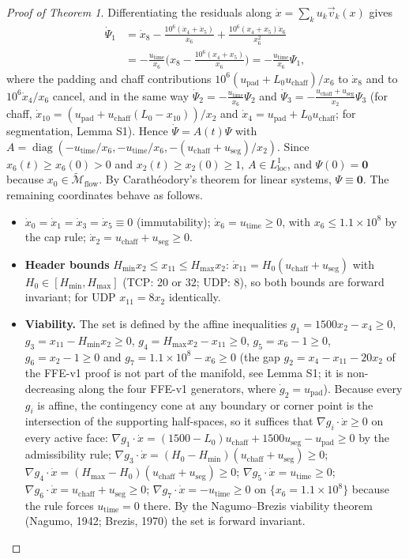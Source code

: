 \begin{proof}[Proof of Theorem 1]
Differentiating the residuals along $\dot x=\sum_ku_k\vec v_k(x)$ gives
\begin{align}
\dot\Psi_1&=\dot x_8-\tfrac{10^6(\dot x_4+\dot x_5)}{x_6}+\tfrac{10^6(x_4+x_5)\dot x_6}{x_6^2}\nonumber\\
 &=-\tfrac{u_{\text{time}}}{x_6}\Big(x_8-\tfrac{10^6(x_4+x_5)}{x_6}\Big)=-\tfrac{u_{\text{time}}}{x_6}\Psi_1,
\end{align}
where the padding and chaff contributions $10^6(u_{\text{pad}}+L_0u_{\text{chaff}})/x_6$ to $\dot x_8$ and to $10^6\dot x_4/x_6$ cancel,
and in the same way $\dot\Psi_2=-\tfrac{u_{\text{time}}}{x_6}\Psi_2$ and $\dot\Psi_3=-\tfrac{u_{\text{chaff}}+u_{\text{seg}}}{x_2}\Psi_3$ (for chaff, $\dot x_{10}=(u_{\text{pad}}+u_{\text{chaff}}(L_0-x_{10}))/x_2$ and $\dot x_4=u_{\text{pad}}+L_0u_{\text{chaff}}$; for segmentation, Lemma S1). Hence $\dot\Psi=A(t)\Psi$ with $A=\operatorname{diag}(-u_{\text{time}}/x_6,-u_{\text{time}}/x_6,-(u_{\text{chaff}}+u_{\text{seg}})/x_2)$. Since $x_6(t)\ge x_6(0)>0$ and $x_2(t)\ge x_2(0)\ge1$, $A\in L^1_{\text{loc}}$, and $\Psi(0)=\mathbf 0$ because $x_0\in\widetilde{\mathcal M}_{\text{flow}}$. By Carath\'eodory's theorem for linear systems, $\Psi\equiv\mathbf 0$. The remaining coordinates behave as follows.
\begin{itemize}
    \item $\dot x_0=\dot x_1=\dot x_3=\dot x_5\equiv0$ (immutability); $\dot x_6=u_{\text{time}}\ge0$, with $x_6\le1.1\times10^8$ by the cap rule; $\dot x_2=u_{\text{chaff}}+u_{\text{seg}}\ge0$.
    \item \textbf{Header bounds} $H_{\min}x_2\le x_{11}\le H_{\max}x_2$: $\dot x_{11}=H_0(u_{\text{chaff}}+u_{\text{seg}})$ with $H_0\in[H_{\min},H_{\max}]$ (TCP: 20 or 32; UDP: 8), so both bounds are forward invariant; for UDP $x_{11}=8x_2$ identically.
    \item \textbf{Viability.} The set is defined by the affine inequalities $g_1=1500x_2-x_4\ge0$, $g_3=x_{11}-H_{\min}x_2\ge0$, $g_4=H_{\max}x_2-x_{11}\ge0$, $g_5=x_6-1\ge0$, $g_6=x_2-1\ge0$ and $g_7=1.1\times10^8-x_6\ge0$ (the gap $g_2=x_4-x_{11}-20x_2$ of the FFE-v1 proof is not part of the manifold, see Lemma S1; it is non-decreasing along the four FFE-v1 generators, where $\dot g_2=u_{\text{pad}}$). Because every $g_i$ is affine, the contingency cone at any boundary or corner point is the intersection of the supporting half-spaces, so it suffices that $\nabla g_i\cdot\dot x\ge0$ on every active face: $\nabla g_1\cdot\dot x=(1500-L_0)u_{\text{chaff}}+1500u_{\text{seg}}-u_{\text{pad}}\ge0$ by the admissibility rule; $\nabla g_3\cdot\dot x=(H_0-H_{\min})(u_{\text{chaff}}+u_{\text{seg}})\ge0$; $\nabla g_4\cdot\dot x=(H_{\max}-H_0)(u_{\text{chaff}}+u_{\text{seg}})\ge0$; $\nabla g_5\cdot\dot x=u_{\text{time}}\ge0$; $\nabla g_6\cdot\dot x=u_{\text{chaff}}+u_{\text{seg}}\ge0$; $\nabla g_7\cdot\dot x=-u_{\text{time}}\ge0$ on $\{x_6=1.1\times10^8\}$ because the rule forces $u_{\text{time}}=0$ there. By the Nagumo--Brezis viability theorem (Nagumo, 1942; Brezis, 1970) the set is forward invariant.

\end{itemize}
\end{proof}
